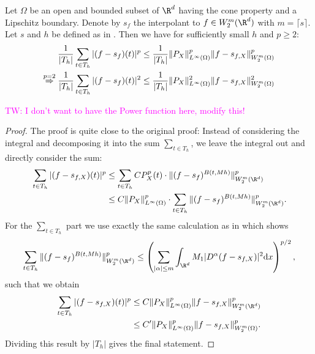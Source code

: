 \documentclass[a4paper, 10pt]{article}
\newcommand{\tw}[1]{\textcolor{magenta}{TW: #1}}
\begin{document}
\begin{theorem}
\label{th:modified_theorem}
Let $\Omega$ be an open and bounded subset of $\R^d$ having the cone property and a Lipschitz boundary.
Denote by $s_f$ the interpolant to $f \in W_2^m(\R^d)$ with $m = \lceil s \rceil$.
Let $s$ and $h$ be defined as in \cite[Theorem 1]{wendland1997sobolev}.
Then we have for sufficiently small $h$ and $p \geq 2$:
\begin{align}
\label{eq:modified_theorem}
\frac{1}{|T_h|} \sum_{t \in T_h} | (f-s_f)(t)|^p \leq \frac{1}{|T_h|} \Vert P_{X} \Vert_{L^\infty(\Omega)}^p \Vert f - s_{f, X} \Vert_{W_2^m(\Omega)}^p \\
\stackrel{p=2}{\Rightarrow} \frac{1}{|T_h|} \sum_{t \in T_h} | (f-s_f)(t)|^2 \leq \frac{1}{|T_h|} \Vert P_{X} \Vert_{L^\infty(\Omega)}^2 \Vert f - s_{f, X} \Vert_{W_2^m(\Omega)}^2 \notag
\end{align}
\end{theorem}

\tw{I don't want to have the Power function here, modify this!}

\begin{proof}
The proof is quite close to the original proof: 
Instead of considering the integral and decomposing it into the sum $\sum_{t \in T_h}$, we leave the integral out and directly consider the sum:
\begin{align*}
\sum_{t \in T_h} |(f - s_{f, X})(t)|^p &\leq \sum_{t \in T_h} C P_X^p(t) \cdot \Vert (f-s_f)^{B(t, Mh)} \Vert_{W_2^m(\R^d)}^p \\
&\leq C \Vert P_X \Vert_{L^\infty(\Omega)}^p \cdot \sum_{t \in T_h} \Vert (f-s_f)^{B(t, Mh)} \Vert_{W_2^m(\R^d)}^p.
\end{align*}
For the $\sum_{t \in T_h}$ part we use exactly the same calculation as in \cite{wendland1997sobolev} which shows
\begin{align*}
\sum_{t \in T_h} \Vert (f-s_f)^{B(t, Mh)} \Vert_{W_2^m(\R^d)}^p \leq \left( \sum_{|\alpha| \leq m} \int_{\R^d} M_1 |D^\alpha(f-s_{f, X})|^2 \mathrm{d}x \right)^{p/2},
\end{align*}
such that we obtain
\begin{align*}
\sum_{t \in T_h} |(f - s_{f, X})(t)|^p &\leq C \Vert P_X \Vert_{L^\infty(\Omega)}^p \Vert f - s_{f, X} \Vert_{W_2^m(\R^d)}^p \\
&\leq C' \Vert P_X \Vert_{L^\infty(\Omega)}^p \Vert f - s_{f, X} \Vert_{W_2^m(\Omega)}^p.
\end{align*}
Dividing this result by $|T_h|$ gives the final statement.
\end{proof}
\end{document}

